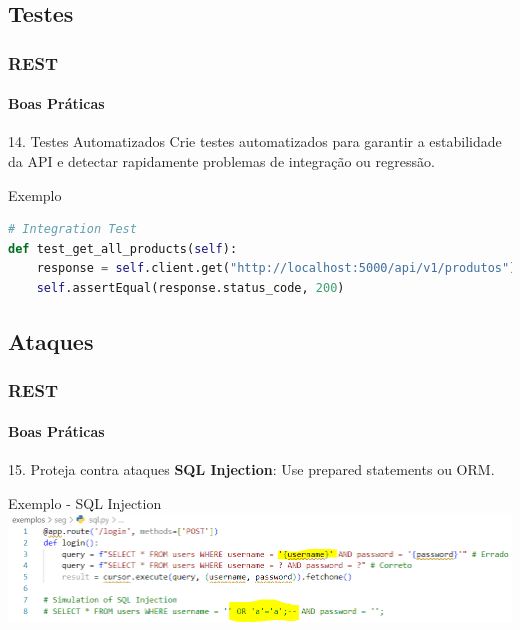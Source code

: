 \documentclass[
	10pt, %
	t, %
]{beamer}
\newcommand{\yellowbox}[1]{\colorbox{yellow!75}{#1}}
\begin{document}
\subsection{Testes}

\begin{frame}[fragile]
	\frametitle{REST}
	\framesubtitle{Boas Práticas}

	\begin{block}{14. Testes Automatizados}
		Crie testes automatizados para garantir a estabilidade da API e detectar rapidamente problemas de integração ou regressão.
	\end{block}

	\begin{exampleblock}{Exemplo}
		\begin{lstlisting}[language=Python, basicstyle=\small]
# Integration Test
def test_get_all_products(self):
	response = self.client.get("http://localhost:5000/api/v1/produtos")
	self.assertEqual(response.status_code, 200)
		\end{lstlisting}

	\end{exampleblock}

\end{frame}

\subsection{Ataques}

\begin{frame}
	\frametitle{REST}
	\framesubtitle{Boas Práticas}

	\begin{block}{15. Proteja contra ataques}
		\textbf{SQL Injection}: Use \yellowbox{prepared statements} ou \yellowbox{ORM}.
	\end{block}

	\begin{exampleblock}{Exemplo - SQL Injection}
		\includegraphics[width=0.9\linewidth]{sql_injection.png}
	\end{exampleblock}

\end{frame}
\end{document}

